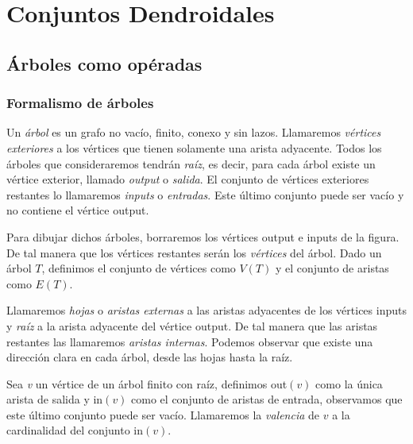 \documentclass[../main.tex]{subfiles}
\begin{document}
\section{Conjuntos Dendroidales}
\subsection{\'Arboles como op\'eradas}
\subsubsection{Formalismo de \'arboles}
Un \emph{\'arbol} es un grafo no vac\'io, finito, conexo y sin lazos. Llamaremos \emph{v\'ertices exteriores} a los v\'ertices que tienen solamente una arista adyacente.
Todos los \'arboles que consideraremos tendr\'an \emph{ra\'iz}, es decir, para cada \'arbol existe un v\'ertice exterior, llamado \emph{output} o \emph{salida}. El conjunto de v\'ertices exteriores restantes lo llamaremos \emph{inputs} o \emph{entradas}. Este \'ultimo conjunto puede ser vac\'io y no contiene el v\'ertice output.

Para dibujar dichos \'arboles, borraremos los v\'ertices output e inputs de la figura. De tal manera que los v\'ertices restantes ser\'an los \emph{v\'ertices} del \'arbol.
Dado un \'arbol $T$, definimos el conjunto de v\'ertices como $V(T)$ y el conjunto de aristas como $E(T)$.

Llamaremos \emph{hojas} o \emph{aristas externas} a las aristas adyacentes de los v\'ertices inputs y \emph{ra\'iz} a la arista adyacente del v\'ertice output.
De tal manera que las aristas restantes las llamaremos \emph{aristas internas}. Podemos observar que existe una direcci\'on clara en cada \'arbol, desde las hojas hasta la ra\'iz.

Sea \emph{v} un v\'ertice de un \'arbol finito con ra\'iz, definimos out$(v)$ como la \'unica arista de salida y in$(v)$ como el conjunto de aristas de entrada, observamos que este \'ultimo conjunto puede ser vac\'io.
Llamaremos la \emph{valencia} de $v$ a la cardinalidad del conjunto in$(v)$.
\end{document}

